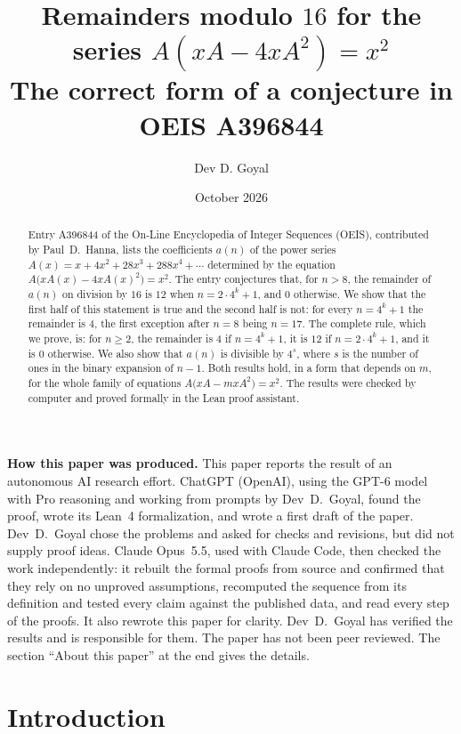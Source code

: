 \documentclass[11pt,a4paper]{article}
\title{Remainders modulo $16$ for the series $A(xA-4xA^2)=x^2$\\[6pt]\large The correct form of a conjecture in OEIS A396844}
\author{Dev D. Goyal}
\date{October 2026}
\theoremstyle{definition}
\theoremstyle{remark}
\begin{document}
\maketitle
\begin{abstract}
Entry A396844 of the On-Line Encyclopedia of Integer Sequences (OEIS), contributed by Paul~D.~Hanna, lists the
coefficients $a(n)$ of the power series $A(x)=x+4x^2+28x^3+288x^4+\cdots$ determined by the equation
$A\bigl(xA(x)-4xA(x)^2\bigr)=x^2$. The entry conjectures that, for $n>8$, the remainder of $a(n)$ on division by $16$ is
$12$ when $n=2\cdot4^k+1$, and $0$ otherwise. We show that the first half of this statement is true and the second
half is not: for every $n=4^k+1$ the remainder is $4$, the first exception after $n=8$ being $n=17$. The complete rule,
which we prove, is: for $n\ge2$, the remainder is $4$ if $n=4^k+1$, it is $12$ if $n=2\cdot4^k+1$, and it is $0$
otherwise. We also show that $a(n)$ is divisible by $4^s$, where $s$ is the number of ones in the binary expansion of
$n-1$. Both results hold, in a form that depends on $m$, for the whole family of equations $A\bigl(xA-mxA^2\bigr)=x^2$.
The results were checked by computer and proved formally in the Lean proof assistant.
\end{abstract}
\begin{center}\begin{minipage}{0.88\linewidth}\small
\textbf{How this paper was produced.} This paper reports the result of an autonomous AI research effort.
ChatGPT (OpenAI), using the GPT-6 model with Pro reasoning and working from prompts by Dev~D.~Goyal, found the proof, wrote its Lean~4 formalization, and wrote a first draft of the paper.
Dev~D.~Goyal chose the problems and asked for checks and revisions, but did not supply proof ideas.
Claude Opus~5.5, used with Claude Code, then checked the work independently: it rebuilt the formal proofs from
source and confirmed that they rely on no unproved assumptions, recomputed the sequence from its definition and tested
every claim against the published data, and read every step of the proofs. It also rewrote this paper for clarity.
Dev~D.~Goyal has verified the results and is responsible for them. The paper has not been peer reviewed.
The section ``About this paper'' at the end gives the details.
\end{minipage}\end{center}

\section{Introduction}
\end{document}
